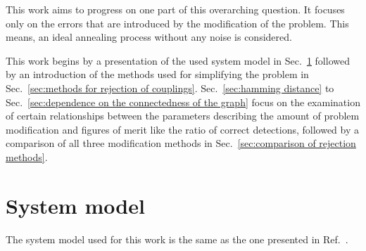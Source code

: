 \documentclass{article}
\begin{document}
	This work aims to progress on one part of this overarching question. It focuses only on the errors that are introduced by the modification of the problem. This means, an ideal annealing process without any noise is considered.  
	
	This work begins by a presentation of the used system model in Sec.~\ref{sec:system model} followed by an introduction of the methods used for simplifying the problem in Sec.~\ref{sec:methods for rejection of couplings}. Sec.~\ref{sec:hamming distance} to Sec.~\ref{sec:dependence on the connectedness of the graph} focus on the examination of certain relationships between the parameters describing the amount of problem modification and figures of merit like the ratio of correct detections, followed by a comparison of all three modification methods in Sec.~\ref{sec:comparison of rejection methods}.
	
	\section{System model}\label{sec:system model}
	The system model used for this work is the same as the one presented in Ref.~\cite{PirGou1}.
	
\end{document}
